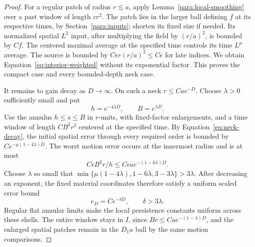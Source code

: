\begin{proof}
For a regular patch of radius $r\lesssim a$, apply
Lemma~\ref{para:local-smoothing} over a past window of length $cr^2$.
The patch lies in the larger ball defining $f$ at its respective
times, by Section~\ref{para:inputs}; shorten its fixed size if needed.
Its normalized spatial $L^2$ input, after multiplying the field by
$(r/a)^2$, is bounded by $Cf$.  The centered maximal average at the
specified time controls its time $L^p$ average.  The source is bounded
by $C\epsilon r(r/a)^2\le C\epsilon$ for late indices.  We obtain
Equation~\eqref{eq:interior-weighted} without its exponential factor.
This proves the compact case and every bounded-depth neck case.

It remains to gain decay as $D\to\infty$.  On such a neck
$r\le Ca e^{-D}$.  Choose $\lambda>0$ sufficiently small and put
\begin{equation}
 h=e^{-4\lambda D},\qquad B=e^{\lambda D}.
 \label{para:neck-window}
\end{equation}
Use the annulus $h\le s\le B$ in $r$-units, with fixed-factor
enlargements, and a time window of length $CB^2r^2$ centered at
the specified time.  By Equation~\eqref{eq:neck-decay}, the initial
spatial error through every required order is bounded by
$Ce^{-\mu(1-4\lambda)D}$.  The worst motion error occurs at the
innermost radius and is at most
\[
 C\epsilon B^2r/h
     \le C\epsilon a e^{-(1-6\lambda)D}.
\]
Choose $\lambda$ so small that
$\min\{\mu(1-4\lambda),1-6\lambda,3-3\lambda\}>3\lambda$.
After decreasing an exponent, the fixed material coordinates
therefore satisfy a uniform scaled error bound
\begin{equation}
 e_D=Ce^{-\delta D},\qquad \delta>3\lambda.
 \label{para:deep-metric-error}
\end{equation}
Regular flat annular limits make the local persistence constants
uniform across these shells.  The entire window stays in $I$,
since $Br\le Ca e^{-(1-\lambda)D}$, and the enlarged spatial patches
remain in the $D_1a$ ball by the same motion comparisons.


\end{proof}
